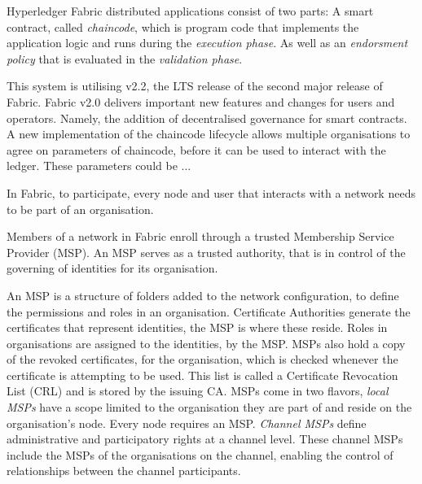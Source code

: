 Hyperledger Fabric distributed applications consist of two parts: A smart contract, called \emph{chaincode}, which is program code that implements the application logic and runs during the \emph{execution phase}.
As well as an \emph{endorsment policy} that is evaluated in the \emph{validation phase}. \cite{androulaki_hyperledger_2018} \linebreak[1]

This system is utilising v2.2, the LTS release of the second major release of Fabric. 
Fabric v2.0 delivers important new features and changes for users and operators. %
Namely, the addition of decentralised governance for smart contracts. 
A new implementation of the chaincode lifecycle allows multiple organisations to agree on parameters of chaincode, before it can be used to interact with the ledger. 
These parameters could be ... %
\cite{noauthor_whats_nodate}

In Fabric, to participate, every node and user that interacts with a network needs to be part of an organisation. \cite{noauthor_using_nodate}

Members of a network in Fabric enroll through a trusted Membership Service Provider (MSP). \cite{noauthor_introduction_nodate}
An MSP serves as a trusted authority, that is in control of the governing of identities for its organisation. 

An MSP is a structure of folders added to the network configuration, to define the permissions and roles in an organisation. 
Certificate Authorities generate the certificates that represent identities, the MSP is where these reside. 
Roles in organisations are assigned to the identities, by the MSP. 
MSPs also hold a copy of the revoked certificates, for the organisation, which is checked whenever the certificate is attempting to be used. \cite{noauthor_membership_nodate}
This list is called a Certificate Revocation List (CRL) \cite{cooper_internet_nodate} and is stored by the issuing CA. \cite{noauthor_identity_nodate}
MSPs come in two flavors, \emph{local MSPs} have a scope limited to the organisation they are part of and reside on the organisation's node. Every node requires an MSP.
\emph{Channel MSPs} define administrative and participatory rights at a channel level. These channel MSPs include the MSPs of the organisations on the channel, enabling the control of relationships between the channel participants. \cite{noauthor_membership_nodate}

